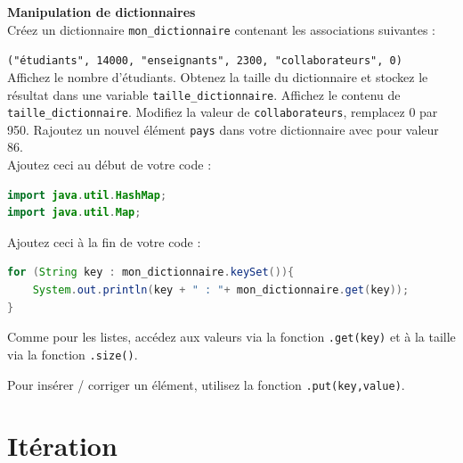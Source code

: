     \begin{Exercice}[15 minutes] [Java] \textbf{Manipulation de dictionnaires}\\
      	Créez un dictionnaire \lstinline{mon_dictionnaire} contenant les associations suivantes :
      	
      	\texttt{("étudiants", 14000, "enseignants", 2300, "collaborateurs", 0)}\\
      	
          Affichez le nombre d'étudiants. Obtenez la taille du dictionnaire et stockez le résultat dans une variable \lstinline{taille_dictionnaire}. Affichez le contenu de \lstinline{taille_dictionnaire}. 
          Modifiez la valeur de \lstinline{collaborateurs}, remplacez 0 par 950. Rajoutez un nouvel élément \lstinline{pays} dans votre dictionnaire avec pour valeur 86.\\
      	
      	Ajoutez ceci au début de votre code :
       
      	\begin{lstlisting}[language=Java]
import java.util.HashMap;
import java.util.Map; \end{lstlisting}
	     
	     Ajoutez ceci à la fin de votre code :
	     
	    \begin{lstlisting}[language=Java]
for (String key : mon_dictionnaire.keySet()){
    System.out.println(key + " : "+ mon_dictionnaire.get(key));
} \end{lstlisting} 
    
        \begin{conseil}
           Comme pour les listes, accédez aux valeurs via la fonction \lstinline{.get(key)} et à la taille via la fonction \lstinline{.size()}.
            
           Pour insérer / corriger un élément, utilisez la fonction \lstinline{.put(key,value)}.
        \end{conseil}
        
        \begin{solution}
            
        \end{solution}
    \end{Exercice}
    
 
    \section{Itération}
    
